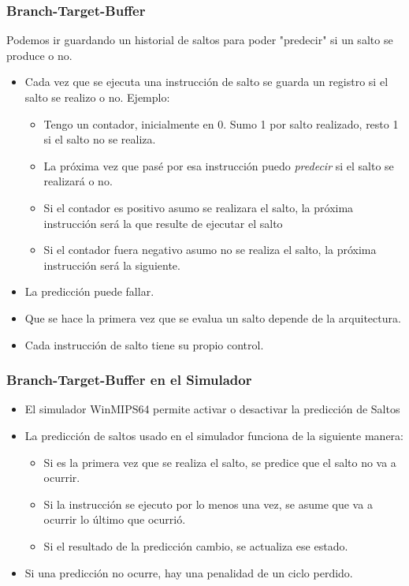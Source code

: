 \documentclass{beamer}
\begin{document}
\begin{frame}
\frametitle{Branch-Target-Buffer}
Podemos ir guardando un historial de saltos para poder "predecir" si un salto se produce o no.
\begin{itemize}
\item Cada vez que se ejecuta una instrucción de salto se guarda un registro si el salto se realizo o no. Ejemplo:
\begin{itemize}
\item Tengo un contador, inicialmente en 0. Sumo 1 por salto realizado, resto 1 si el salto no se realiza.
\item La próxima vez que pasé por esa instrucción puedo \emph{predecir} si el salto se realizará o no. 
\item Si el contador es positivo asumo se realizara el salto, la próxima instrucción será la que resulte de ejecutar el salto
\item Si el contador fuera negativo asumo no se realiza el salto, la próxima instrucción será la siguiente.
\end{itemize}
\item La predicción puede fallar.
\item Que se hace la primera vez que se evalua un salto depende de la arquitectura.
\item Cada instrucción de salto tiene su propio control.
\end{itemize}
\end{frame}

\begin{frame}
\frametitle{Branch-Target-Buffer en el Simulador}
\begin{itemize}
\item El simulador WinMIPS64 permite activar o desactivar la predicción de Saltos
\item La predicción de saltos usado en el simulador funciona de la siguiente manera:
\begin{itemize}
\item Si es la primera vez que se realiza el salto, se predice que el salto no va a ocurrir.
\item Si la instrucción se ejecuto por lo menos una vez, se asume que va a ocurrir lo último que ocurrió.
\item Si el resultado de la predicción cambio, se actualiza ese estado.
\end{itemize}
\item Si una predicción no ocurre, hay una penalidad de un ciclo perdido.\end{itemize}
\end{frame}
\end{document}
